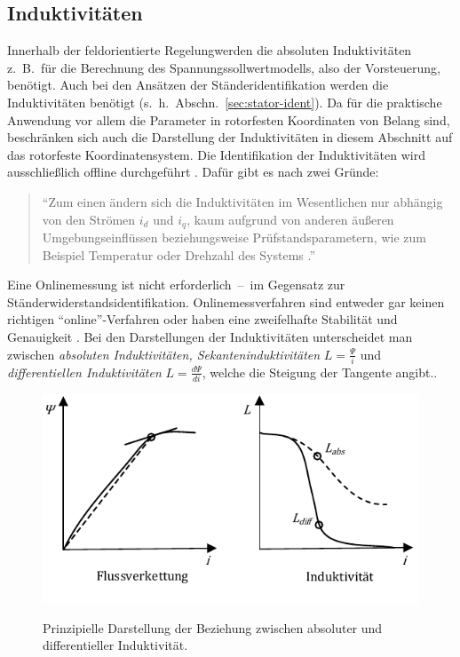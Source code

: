 \documentclass[conference,twocolumn]{IEEEtran}
\newcommand{\FOR}{feldorientierte Regelung}
\begin{document}
\subsection{Induktivitäten}\label{sec:induktiv}

Innerhalb der \FOR werden die absoluten Induktivitäten z.\ B.\ für die Berechnung des Spannungssollwertmodells, also der Vorsteuerung, benötigt.
Auch bei den Ansätzen der Ständeridentifikation werden die Induktivitäten benötigt (s.~h.~Abschn.~\ref{sec:stator-ident}).
Da für die praktische Anwendung vor allem die Parameter in rotorfesten Koordinaten von Belang sind, beschränken sich auch die Darstellung der Induktivitäten in diesem Abschnitt auf das rotorfeste Koordinatensystem.
Die Identifikation der Induktivitäten wird ausschließlich offline durchgeführt \autocite{Kellner2012}.
Dafür gibt es nach \textcite{Kellner2012} zwei Gründe:

\begin{quote}
\enquote{Zum einen ändern sich die Induktivitäten im Wesentlichen nur abhängig von den Strömen $i_d$ und $i_q$, kaum aufgrund von anderen äußeren Umgebungseinflüssen beziehungsweise Prüfstandsparametern, wie zum Beispiel Temperatur oder Drehzahl des Systems \autocite[S.~79]{Kellner2012}.}
\end{quote}

Eine Onlinemessung ist nicht erforderlich~--~im Gegensatz zur Ständerwiderstandsidentifikation.
Onlinemessverfahren sind entweder gar keinen richtigen \enquote{online}-Verfahren oder haben eine zweifelhafte Stabilität und Genauigkeit \autocite{underwood_online_2010}.
Bei den Darstellungen der Induktivitäten unterscheidet man zwischen \emph{absoluten Induktivitäten, Sekanteninduktivitäten} $L = \frac{\Psi}{i}$ und \emph{differentiellen Induktivitäten} $L = \frac{d\Psi}{di}$, welche die Steigung der Tangente angibt..

\begin{figure}
\includegraphics[width=\columnwidth]{img/induktiv}
\label{fig:induktiv}
\caption{Prinzipielle Darstellung der Beziehung zwischen absoluter und differentieller Induktivität.}
\end{figure}
\end{document}
